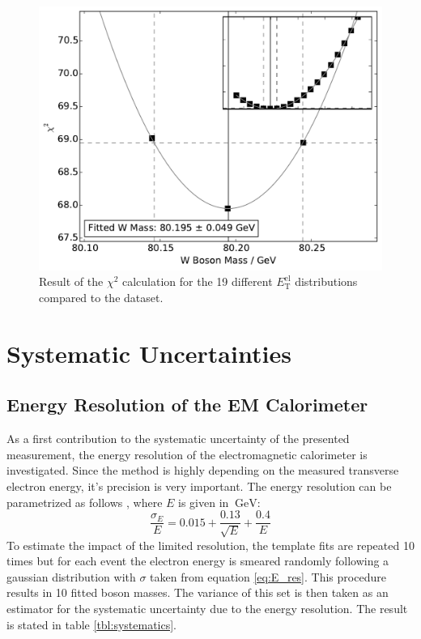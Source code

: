\documentclass[
	paper=A4,
	parskip=full,
	chapterprefix=true,
	11pt,
	headings=normal,
	bibliography=totoc,
	listof=totoc,
	titlepage=on,
]{scrreprt}
\newcommand{\ELET}{\ensuremath{{E_\mathrm{T}^\mathrm{el}}}\xspace}
\begin{document}
\begin{figure}
	\centering
	\includegraphics{chisquare_m_t}
	\caption{Result of the $\chi^2$ calculation for the 19 different \ELET distributions compared to the dataset.}
	\label{fig:chisquare_el_et}
\end{figure}

\section{Systematic Uncertainties}
\subsection{Energy Resolution of the EM Calorimeter}
As a first contribution to the systematic uncertainty of the presented measurement, the energy resolution of the electromagnetic calorimeter is investigated. Since the method is highly depending on the measured transverse electron energy, it's precision is very important. The energy resolution can be parametrized as follows \cite{PhysRevLett.77.3309}, where $E$ is given in $\SI{}{\giga\electronvolt}$:
\begin{equation}
\frac{\sigma_E}{E} = 0.015 + \frac{0.13}{\sqrt{E}} + \frac{0.4}{E}
\label{eq:E_res}
\end{equation}
To estimate the impact of the limited resolution, the template fits are repeated 10 times but for each event the electron energy is smeared randomly following a gaussian distribution with $\sigma$ taken from equation \ref{eq:E_res}. This procedure results in 10 fitted \PW boson masses. The variance of this set is then taken as an estimator for the systematic uncertainty due to the energy resolution. The result is stated in table \ref{tbl:systematics}.
\end{document}
